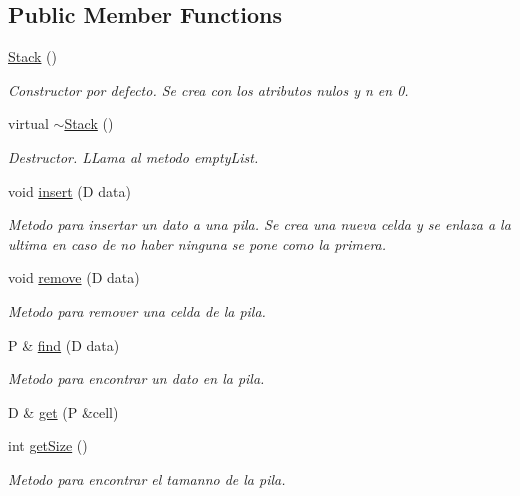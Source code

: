 \subsection*{Public Member Functions}
\begin{DoxyCompactItemize}
\item 
\hyperlink{classStack_a6e0f84830cde41cb8d49818842d18d36}{Stack} ()
\begin{DoxyCompactList}\small\item\em Constructor por defecto. Se crea con los atributos nulos y n en 0. \end{DoxyCompactList}\item 
virtual \hyperlink{classStack_a063692d7f83addeb743eec7a3f97a957}{$\sim$\+Stack} ()
\begin{DoxyCompactList}\small\item\em Destructor. L\+Lama al metodo empty\+List. \end{DoxyCompactList}\item 
void \hyperlink{classStack_a2d8dfebafe6767cd668bcfc64d33bf63}{insert} (D data)
\begin{DoxyCompactList}\small\item\em Metodo para insertar un dato a una pila. Se crea una nueva celda y se enlaza a la ultima en caso de no haber ninguna se pone como la primera. \end{DoxyCompactList}\item 
void \hyperlink{classStack_a44889855bb26c4b1e050668959fab5be}{remove} (D data)
\begin{DoxyCompactList}\small\item\em Metodo para remover una celda de la pila. \end{DoxyCompactList}\item 
P \& \hyperlink{classStack_a2d24bac6bd65a0c90dd0dbe5c1297c1b}{find} (D data)
\begin{DoxyCompactList}\small\item\em Metodo para encontrar un dato en la pila. \end{DoxyCompactList}\item 
D \& \hyperlink{classStack_a488e4c5a68c70b5221df734fd953983f}{get} (P \&cell)
\item 
int \hyperlink{classStack_a74fc7e5921dfb247f9ad7052c3c4297a}{get\+Size} ()
\begin{DoxyCompactList}\small\item\em Metodo para encontrar el tamanno de la pila. \end{DoxyCompactList}\item 

\end{DoxyCompactItemize}

